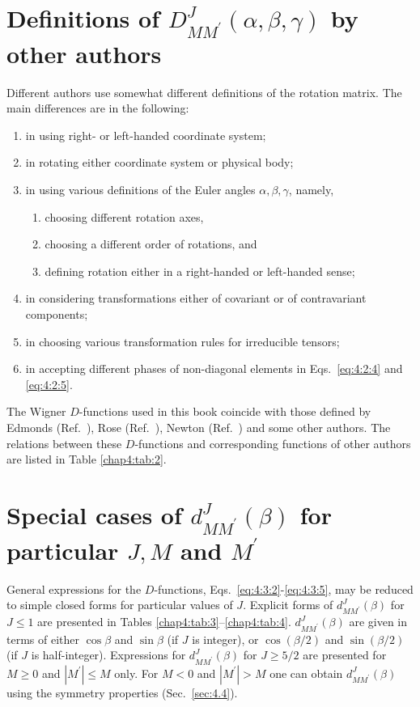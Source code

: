 \section{Definitions of $D_{M M^{\prime}}^{J}(\alpha, \beta, \gamma)$ by other authors}\label{sec:4.19}
Different authors use somewhat different definitions of the rotation matrix. The main differences are in the following:
\begin{enumerate}[label=(\alph*)]
\item in using right- or left-handed coordinate system;
\item in rotating either coordinate system or physical body;
\item in using various definitions of the Euler angles $\alpha, \beta, \gamma$, namely,
\begin{enumerate}[label=(\roman*)]
\item choosing different rotation axes,
\item choosing a different order of rotations, and
\item defining rotation either in a right-handed or left-handed sense;
\end{enumerate}
\item in considering transformations either of covariant or of contravariant components;
\item in choosing various transformation rules for irreducible tensors;
\item in accepting different phases of non-diagonal elements in Eqs.~\eqref{eq:4:2:4} and \eqref{eq:4:2:5}.
\end{enumerate}
The Wigner $D$-functions used in this book coincide with those defined by Edmonds (Ref.~\cite{ref064}), Rose (Ref.~\cite{ref030}), Newton (Ref.~\cite{ref028}) and some other authors. The relations between these $D$-functions and corresponding functions of other authors are listed in Table \ref{chap4:tab:2}.

\section{Special cases of $d_{M M^{\prime}}^{J}(\beta)$ for particular $J, M$ and $M^{\prime}$}\label{sec:4.20}
General expressions for the $D$-functions, Eqs.~\eqref{eq:4:3:2}-\eqref{eq:4:3:5}, may be reduced to simple closed forms for particular values of $J$. Explicit forms of $d_{M M^{\prime}}^{J}(\beta)$ for $J \leq 1$ are presented in Tables \ref{chap4:tab:3}--\ref{chap4:tab:4}. $d_{M M^{\prime}}^{J}(\beta)$ are given in terms of either $\cos \beta$ and $\sin \beta$ (if $J$ is integer), or $\cos (\beta / 2)$ and $\sin (\beta / 2)$ (if $J$ is half-integer). Expressions for $d_{M M^{\prime}}^{J}(\beta)$ for $J \geq 5 / 2$ are presented for $M \geq 0$ and $\left|M^{\prime}\right| \leq M$ only. For $M<0$ and $\left|M^{\prime}\right|>M$ one can obtain $d_{M M^{\prime}}^{J}(\beta)$ using the symmetry properties (Sec.~\ref{sec:4.4}).



